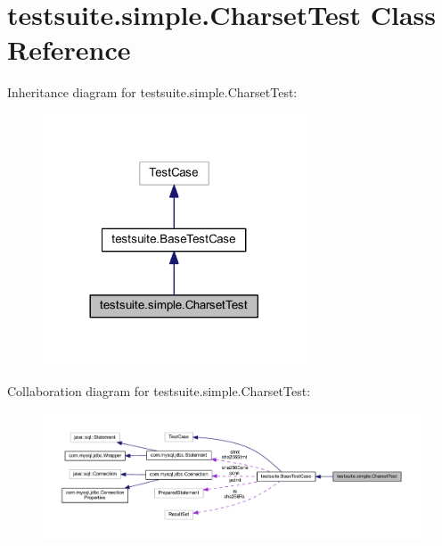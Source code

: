 \hypertarget{classtestsuite_1_1simple_1_1_charset_test}{}\section{testsuite.\+simple.\+Charset\+Test Class Reference}
\label{classtestsuite_1_1simple_1_1_charset_test}


Inheritance diagram for testsuite.\+simple.\+Charset\+Test\+:
\nopagebreak
\begin{figure}[H]
\begin{center}
\leavevmode
\includegraphics[width=221pt]{classtestsuite_1_1simple_1_1_charset_test__inherit__graph}
\end{center}
\end{figure}


Collaboration diagram for testsuite.\+simple.\+Charset\+Test\+:
\nopagebreak
\begin{figure}[H]
\begin{center}
\leavevmode
\includegraphics[width=350pt]{classtestsuite_1_1simple_1_1_charset_test__coll__graph}
\end{center}
\end{figure}
